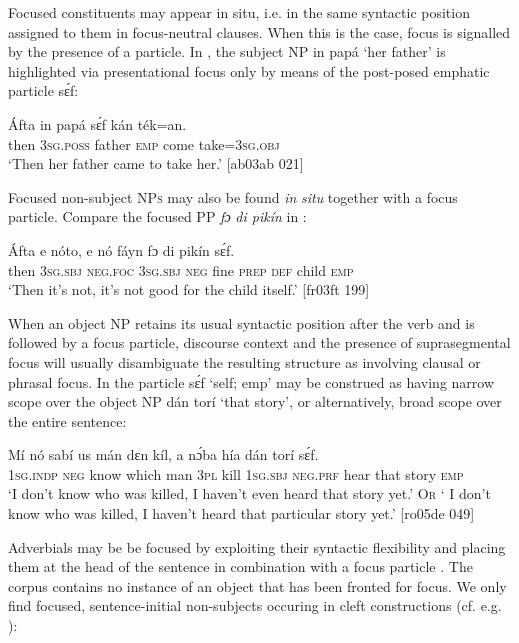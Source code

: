 Focused constituents may appear in situ, i.e. in the same syntactic position assigned to them in focus-neutral clauses. When this is the case, focus is signalled by the presence of a particle. In , the subject NP in papá ‘her father’ is highlighted via presentational focus{\fff} only by means of the post-posed emphatic particle sɛ́f: 


\ea%
    \label{ex:key:683}
    \gll \'{A}fta    in    papá  sɛ́f  kán    ték=an.\\
then  \textsc{3sg.poss}  father  \textsc{emp}  come  take=\textsc{3sg.obj}\\

\glt ‘Then her father came to take her.’ [ab03ab 021]
\z

Focused non-subject \textsc{NPs} may also be found \textit{in} \textit{situ} together with a focus particle. Compare the focused PP \textit{fɔ} \textit{di pikín} in : 


\ea%
    \label{ex:key:684}
    \gll \'{A}fta    e    nóto,  e    nó  fáyn    fɔ  di  pikín  sɛ́f.\\
then  \textsc{3sg.sbj}  \textsc{neg}.\textsc{foc}  \textsc{3sg.sbj}  \textsc{neg}  fine    \textsc{prep}  \textsc{def}  child  \textsc{emp}\\

\glt ‘Then it’s not, it’s not good for the child itself.’ [fr03ft 199]
\z

When an object NP retains its usual syntactic position after the verb and is followed by a focus particle, discourse context and the presence of suprasegmental focus will usually disambiguate the resulting structure as involving clausal or phrasal focus. In  the particle sɛ́f ‘self; emp’ may be construed as having narrow scope over the object NP dán torí ‘that story’, or alternatively, broad scope over the entire sentence: 


\ea%
    \label{ex:key:685}
    \gll Mí    nó  sabí    us    mán    dɛn  kíl,  a    nɔ́ba
hía    dán    torí    sɛ́f.\\
\textsc{1sg.indp}  \textsc{neg}  know  which  man    \textsc{3pl}  kill  \textsc{1sg.sbj}  \textsc{neg}.\textsc{prf}
hear     that  story  \textsc{emp}\\

\glt ‘I don’t know who was killed, I haven’t even heard that story yet.’ 
\textsc{Or} ‘ I don’t know who was killed, I haven’t heard that particular 
story yet.’ [ro05de 049]
\z

Adverbials may be be focused by exploiting their syntactic flexibility and placing them at the head of the sentence in combination with a focus particle . The corpus contains no instance of an object that has been fronted for focus. We only find focused, sentence-initial non-subjects occuring in cleft constructions (cf. e.g. ):


